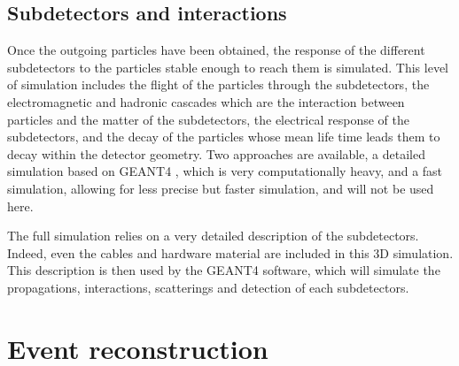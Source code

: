 \subsection{Subdetectors and interactions}

Once the outgoing particles have been obtained, the response of the different subdetectors to the particles stable enough to reach them is simulated. This level of simulation includes the flight of the particles through the subdetectors, the electromagnetic and hadronic cascades which are the interaction between particles and the matter of the subdetectors, the electrical response of the subdetectors, and the decay of the particles whose mean life time leads them to decay within the detector geometry. Two approaches are available, a detailed simulation based on GEANT4 \cite{AGOSTINELLI2003250}, which is very computationally heavy, and a fast simulation, allowing for less precise but faster simulation, and will not be used here.

The full simulation relies on a very detailed description of the subdetectors. Indeed, even the cables and hardware material are included in this 3D simulation. This description is then used by the GEANT4 software, which will simulate the propagations, interactions, scatterings and detection of each subdetectors.


\section{Event reconstruction}
\label{sec:cms_physics_event_reconstruction}

